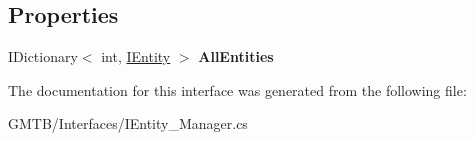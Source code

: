 \subsection*{Properties}
\begin{DoxyCompactItemize}
\item 
\mbox{\label{interface_g_m_t_b_1_1_interfaces_1_1_i_entity___manager_aec3660eeaf9277e19b30a576af5fa62f}} 
I\+Dictionary$<$ int, \mbox{\hyperlink{interface_g_m_t_b_1_1_interfaces_1_1_i_entity}{I\+Entity}} $>$ {\bfseries All\+Entities}
\end{DoxyCompactItemize}


The documentation for this interface was generated from the following file\+:\begin{DoxyCompactItemize}
\item 
G\+M\+T\+B/\+Interfaces/I\+Entity\+\_\+\+Manager.\+cs\end{DoxyCompactItemize}
